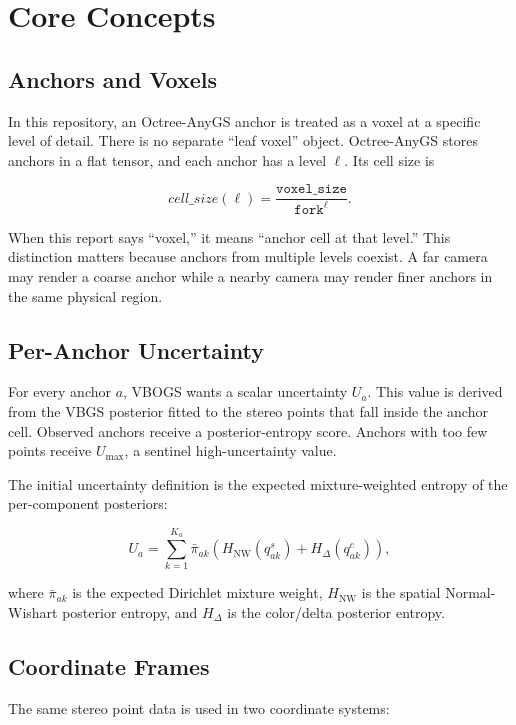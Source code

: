 \documentclass[11pt]{article}
\newcommand{\Umax}{U_{\max}}
\begin{document}
\section{Core Concepts}

\subsection{Anchors and Voxels}

In this repository, an Octree-AnyGS anchor is treated as a voxel at a specific
level of detail. There is no separate ``leaf voxel'' object. Octree-AnyGS stores
anchors in a flat tensor, and each anchor has a level \(\ell\). Its cell size is

\[
  cell\_size(\ell)
  =
  \frac{\texttt{voxel\_size}}{\texttt{fork}^{\ell}}.
\]

When this report says ``voxel,'' it means ``anchor cell at that level.'' This
distinction matters because anchors from multiple levels coexist. A far camera
may render a coarse anchor while a nearby camera may render finer anchors in the
same physical region.

\subsection{Per-Anchor Uncertainty}

For every anchor \(a\), VBOGS wants a scalar uncertainty \(U_a\). This value is
derived from the VBGS posterior fitted to the stereo points that fall inside the
anchor cell. Observed anchors receive a posterior-entropy score. Anchors with
too few points receive \(\Umax\), a sentinel high-uncertainty value.

The initial uncertainty definition is the expected mixture-weighted entropy of
the per-component posteriors:

\[
  U_a
  =
  \sum_{k=1}^{K_a}
  \bar{\pi}_{ak}
  \left(
    H_{\mathrm{NW}}(q^s_{ak})
    +
    H_{\Delta}(q^c_{ak})
  \right),
\]

where \(\bar{\pi}_{ak}\) is the expected Dirichlet mixture weight,
\(H_{\mathrm{NW}}\) is the spatial Normal-Wishart posterior entropy, and
\(H_{\Delta}\) is the color/delta posterior entropy.

\subsection{Coordinate Frames}

The same stereo point data is used in two coordinate systems:
\end{document}
